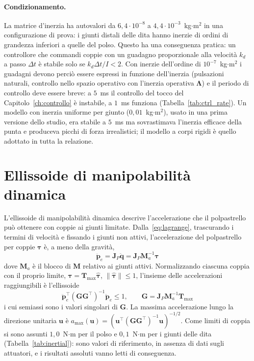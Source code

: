 \paragraph{Condizionamento.} La matrice d'inerzia ha autovalori da $6{,}4\cdot10^{-8}$ a $4{,}4\cdot10^{-3}$~kg$\cdot$m$^2$ in una configurazione di prova: i giunti distali delle dita hanno inerzie di ordini di grandezza inferiori a quelle del polso. 
Questo ha una conseguenza pratica: un controllore che commandi coppie con un guadagno proporzionale alla velocità $k_d$ a passo $\Delta t$ è stabile solo se $k_d\Delta t/I<2$. Con inerzie dell'ordine di $10^{-7}$~kg$\cdot$m$^2$ i guadagni devono perciò essere espressi in funzione dell'inerzia (pulsazioni naturali, controllo nello spazio operativo con l'inerzia operativa $\boldsymbol\Lambda$) e il periodo di controllo deve essere breve: a $5$~ms il controllo del tocco del Capitolo~\ref{ch:controllo} è instabile, a $1$~ms funziona (Tabella~\ref{tab:ctrl_rate}). Un modello con inerzia uniforme per giunto ($0{,}01$~kg$\cdot$m$^2$), usato in una prima versione dello studio, era stabile a $5$~ms ma sovrastimava l'inerzia efficace della punta e produceva picchi di forza irrealistici; il modello a corpi rigidi è quello adottato in tutta la relazione.

\section{Ellissoide di manipolabilità dinamica}
\label{sec:dyn_manipulability}

L'ellissoide di manipolabilità dinamica descrive l'accelerazione che il polpastrello può ottenere con coppie ai giunti limitate. 
Dalla~\eqref{eq:lagrange}, trascurando i termini di velocità e fissando i giunti non attivi, l'accelerazione del polpastrello per coppie $\boldsymbol\tau$ è, a meno della gravità,
\begin{equation}
    \ddot{\boldsymbol p}_e=\boldsymbol J_P\ddot{\boldsymbol q}=\boldsymbol J_P\boldsymbol M_a^{-1}\boldsymbol\tau
\end{equation}
dove $\boldsymbol M_a$ è il blocco di $\boldsymbol M$ relativo ai giunti attivi. Normalizzando ciascuna coppia con il proprio limite, $\boldsymbol\tau=\boldsymbol T_{\max}\hat{\boldsymbol\tau}$, $\|\hat{\boldsymbol\tau}\|\le 1$, l'insieme delle accelerazioni raggiungibili è l'ellissoide
\begin{equation}
    \ddot{\boldsymbol p}_e^\top\left(\boldsymbol G\boldsymbol G^\top\right)^{-1}\ddot{\boldsymbol p}_e\le 1,\qquad
    \boldsymbol G=\boldsymbol J_P\boldsymbol M_a^{-1}\boldsymbol T_{\max}
\end{equation}
i cui semiassi sono i valori singolari di $\boldsymbol G$. La massima accelerazione lungo la direzione unitaria $\boldsymbol u$ è $a_{\max}(\boldsymbol u)=\left(\boldsymbol u^\top(\boldsymbol G\boldsymbol G^\top)^{-1}\boldsymbol u\right)^{-1/2}$. Come limiti di coppia si sono assunti $1{,}0$~N$\cdot$m per il polso e $0{,}1$~N$\cdot$m per i giunti delle dita (Tabella~\ref{tab:inertial}): sono valori di riferimento, in assenza di dati sugli attuatori, e i risultati assoluti vanno letti di conseguenza.

